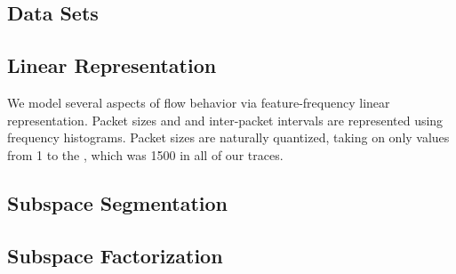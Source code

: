 \documentclass[conference]{IEEEtran}
\begin{document}

\subsection{Data Sets}

\subsection{Linear Representation}

We model several aspects of flow behavior via feature-frequency linear representation.
Packet sizes and and inter-packet intervals are represented using frequency histograms.
Packet sizes are naturally quantized, taking on only values from 1 to the , which was 1500 in all of our traces.

\subsection{Subspace Segmentation}

\subsection{Subspace Factorization}
\end{document}
